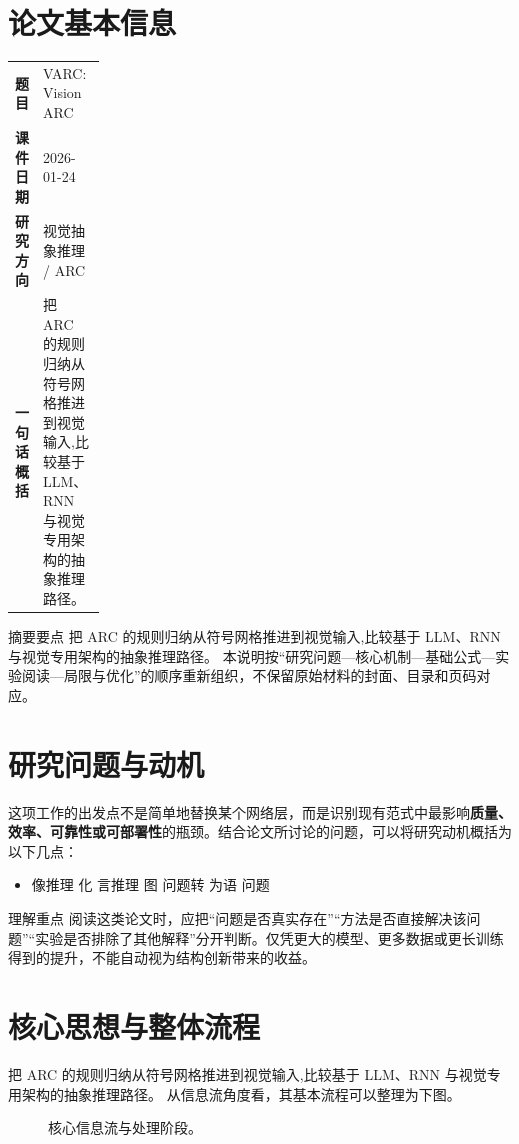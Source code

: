 \documentclass[UTF8,11pt,a4paper]{ctexart}
\newcommand{\term}[1]{\textbf{\textcolor{mainblue}{#1}}}
\begin{document}
\section{论文基本信息}
\begin{center}
\begin{tabularx}{0.94\linewidth}{>{\bfseries}p{0.18\linewidth}X}
\toprule
题目 & VARC: Vision ARC\\
课件日期 & 2026-01-24\\
研究方向 & 视觉抽象推理 / ARC\\
一句话概括 & 把 ARC 的规则归纳从符号网格推进到视觉输入,比较基于 LLM、RNN 与视觉专用架构的抽象推理路径。\\
\bottomrule
\end{tabularx}
\end{center}

\begin{infobox}{摘要要点}
把 ARC 的规则归纳从符号网格推进到视觉输入,比较基于 LLM、RNN 与视觉专用架构的抽象推理路径。 本说明按“研究问题—核心机制—基础公式—实验阅读—局限与优化”的顺序重新组织，不保留原始材料的封面、目录和页码对应。
\end{infobox}

\section{研究问题与动机}
这项工作的出发点不是简单地替换某个网络层，而是识别现有范式中最影响\term{质量、效率、可靠性或可部署性}的瓶颈。结合论文所讨论的问题，可以将研究动机概括为以下几点：
\begin{itemize}
\item 像推理 化 言推理 图 问题转 为语 问题
\end{itemize}

\begin{notebox}{理解重点}
阅读这类论文时，应把“问题是否真实存在”“方法是否直接解决该问题”“实验是否排除了其他解释”分开判断。仅凭更大的模型、更多数据或更长训练得到的提升，不能自动视为结构创新带来的收益。
\end{notebox}

\section{核心思想与整体流程}
把 ARC 的规则归纳从符号网格推进到视觉输入,比较基于 LLM、RNN 与视觉专用架构的抽象推理路径。 从信息流角度看，其基本流程可以整理为下图。

\begin{figure}[H]
\centering
{}
\caption{核心信息流与处理阶段。}
\end{figure}
\end{document}
